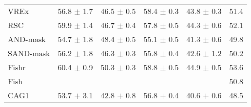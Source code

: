\documentclass{article}
\begin{document}
\begin{center}
{\begin{tabular}{lccccc}
VREx                 & 56.8 $\pm$ 1.7       & 46.5 $\pm$ 0.5       & 58.4 $\pm$ 0.3       & 43.8 $\pm$ 0.3       & 51.4                 \\
RSC                  & 59.9 $\pm$ 1.4       & 46.7 $\pm$ 0.4       & 57.8 $\pm$ 0.5       & 44.3 $\pm$ 0.6       & 52.1                 \\
AND-mask             & 54.7 $\pm$ 1.8       & 48.4 $\pm$ 0.5       & 55.1 $\pm$ 0.5       & 41.3 $\pm$ 0.6       & 49.8                 \\
SAND-mask            & 56.2 $\pm$ 1.8       & 46.3 $\pm$ 0.3       & 55.8 $\pm$ 0.4       & 42.6 $\pm$ 1.2       & 50.2                 \\
Fishr                & 60.4 $\pm$ 0.9       & 50.3 $\pm$ 0.3       & 58.8 $\pm$ 0.5       & 44.9 $\pm$ 0.5       & 53.6                 \\
Fish                 &                      &                      &                      &                      & 50.8                 \\
\midrule
CAG1                 & 53.7 $\pm$ 3.1       & 42.8 $\pm$ 0.8       & 56.8 $\pm$ 0.4       & 40.6 $\pm$ 0.6       & 48.5                 \\

\bottomrule
\end{tabular}}
\end{center}
\end{document}
